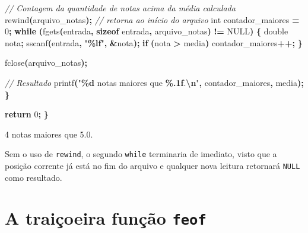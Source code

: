 \documentclass[
  11pt,
  a4paper,
]{scrbook}
\newenvironment{Shaded}{\begin{snugshade}}{\end{snugshade}}
\newcommand{\CommentTok}[1]{\textcolor[rgb]{0.56,0.35,0.01}{\textit{#1}}}
\newcommand{\ControlFlowTok}[1]{\textcolor[rgb]{0.13,0.29,0.53}{\textbf{#1}}}
\newcommand{\DataTypeTok}[1]{\textcolor[rgb]{0.13,0.29,0.53}{#1}}
\newcommand{\DecValTok}[1]{\textcolor[rgb]{0.00,0.00,0.81}{#1}}
\newcommand{\KeywordTok}[1]{\textcolor[rgb]{0.13,0.29,0.53}{\textbf{#1}}}
\newcommand{\NormalTok}[1]{#1}
\newcommand{\OperatorTok}[1]{\textcolor[rgb]{0.81,0.36,0.00}{\textbf{#1}}}
\newcommand{\SpecialCharTok}[1]{\textcolor[rgb]{0.81,0.36,0.00}{\textbf{#1}}}
\newcommand{\StringTok}[1]{\textcolor[rgb]{0.31,0.60,0.02}{#1}}
\begin{document}
\begin{Shaded}
\begin{Highlighting}[]
        \CommentTok{// Contagem da quantidade de notas acima da média calculada}
\NormalTok{        rewind}\OperatorTok{(}\NormalTok{arquivo\_notas}\OperatorTok{);}  \CommentTok{// retorna ao início do arquivo}
        \DataTypeTok{int}\NormalTok{ contador\_maiores }\OperatorTok{=} \DecValTok{0}\OperatorTok{;}
        \ControlFlowTok{while} \OperatorTok{(}\NormalTok{fgets}\OperatorTok{(}\NormalTok{entrada}\OperatorTok{,} \KeywordTok{sizeof}\NormalTok{ entrada}\OperatorTok{,}\NormalTok{ arquivo\_notas}\OperatorTok{)} \OperatorTok{!=}\NormalTok{ NULL}\OperatorTok{)} \OperatorTok{\{}
            \DataTypeTok{double}\NormalTok{ nota}\OperatorTok{;}
\NormalTok{            sscanf}\OperatorTok{(}\NormalTok{entrada}\OperatorTok{,} \StringTok{"}\SpecialCharTok{\%lf}\StringTok{"}\OperatorTok{,} \OperatorTok{\&}\NormalTok{nota}\OperatorTok{);}
            \ControlFlowTok{if} \OperatorTok{(}\NormalTok{nota }\OperatorTok{\textgreater{}}\NormalTok{ media}\OperatorTok{)}
\NormalTok{                contador\_maiores}\OperatorTok{++;}
        \OperatorTok{\}}

\NormalTok{        fclose}\OperatorTok{(}\NormalTok{arquivo\_notas}\OperatorTok{);}

        \CommentTok{// Resultado}
\NormalTok{        printf}\OperatorTok{(}\StringTok{"}\SpecialCharTok{\%d}\StringTok{ notas maiores que }\SpecialCharTok{\%.1f}\StringTok{.}\SpecialCharTok{\textbackslash{}n}\StringTok{"}\OperatorTok{,}\NormalTok{ contador\_maiores}\OperatorTok{,}\NormalTok{ media}\OperatorTok{);}
    \OperatorTok{\}}

    \ControlFlowTok{return} \DecValTok{0}\OperatorTok{;}
\OperatorTok{\}}
\end{Highlighting}
\end{Shaded}

\begin{Shaded}
\begin{Highlighting}[]
\NormalTok{4 notas maiores que 5.0.}
\end{Highlighting}
\end{Shaded}

Sem o uso de \texttt{rewind}, o segundo \texttt{while} terminaria de
imediato, visto que a posição corrente já está no fim do arquivo e
qualquer nova leitura retornará \texttt{NULL} como resultado.

\section{\texorpdfstring{A traiçoeira função
\texttt{feof}}{A traiçoeira função feof}}\label{a-traiuxe7oeira-funuxe7uxe3o-feof}
\end{document}
